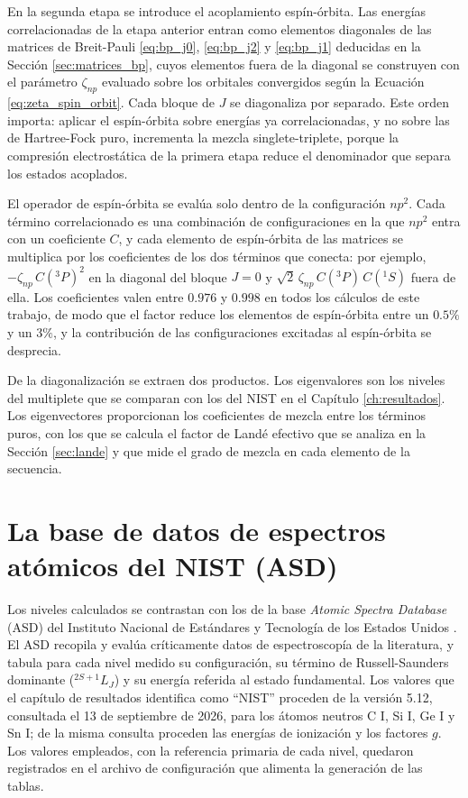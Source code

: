 En la segunda etapa se introduce el acoplamiento espín-órbita. Las energías correlacionadas de la etapa anterior entran como elementos diagonales de las matrices de Breit-Pauli \eqref{eq:bp_j0}, \eqref{eq:bp_j2} y \eqref{eq:bp_j1} deducidas en la Sección \ref{sec:matrices_bp}, cuyos elementos fuera de la diagonal se construyen con el parámetro $\zeta_{np}$ evaluado sobre los orbitales convergidos según la Ecuación \eqref{eq:zeta_spin_orbit}. Cada bloque de $J$ se diagonaliza por separado. Este orden importa: aplicar el espín-órbita sobre energías ya correlacionadas, y no sobre las de Hartree-Fock puro, incrementa la mezcla singlete-triplete, porque la compresión electrostática de la primera etapa reduce el denominador que separa los estados acoplados.

El operador de espín-órbita se evalúa solo dentro de la configuración $np^2$. Cada término correlacionado es una combinación de configuraciones en la que $np^2$ entra con un coeficiente $C$, y cada elemento de espín-órbita de las matrices se multiplica por los coeficientes de los dos términos que conecta: por ejemplo, $-\zeta_{np}\,C(^3P)^2$ en la diagonal del bloque $J=0$ y $\sqrt{2}\,\zeta_{np}\,C(^3P)\,C(^1S)$ fuera de ella. Los coeficientes valen entre $0.976$ y $0.998$ en todos los cálculos de este trabajo, de modo que el factor reduce los elementos de espín-órbita entre un $0.5\%$ y un $3\%$, y la contribución de las configuraciones excitadas al espín-órbita se desprecia.

De la diagonalización se extraen dos productos. Los eigenvalores son los niveles del multiplete que se comparan con los del NIST en el Capítulo \ref{ch:resultados}. Los eigenvectores proporcionan los coeficientes de mezcla entre los términos puros, con los que se calcula el factor de Landé efectivo que se analiza en la Sección \ref{sec:lande} y que mide el grado de mezcla en cada elemento de la secuencia.

\section{La base de datos de espectros atómicos del NIST (ASD)}
\label{sec:nist_asd}

Los niveles calculados se contrastan con los de la base \textit{Atomic Spectra Database} (ASD) del Instituto Nacional de Estándares y Tecnología de los Estados Unidos \parencite{NIST_ASD}. El ASD recopila y evalúa críticamente datos de espectroscopía de la literatura, y tabula para cada nivel medido su configuración, su término de Russell-Saunders dominante ($^{2S+1}L_J$) y su energía referida al estado fundamental. Los valores que el capítulo de resultados identifica como ``NIST'' proceden de la versión 5.12, consultada el 13 de septiembre de 2026, para los átomos neutros C I, Si I, Ge I y Sn I; de la misma consulta proceden las energías de ionización y los factores $g$. Los valores empleados, con la referencia primaria de cada nivel, quedaron registrados en el archivo de configuración que alimenta la generación de las tablas.

